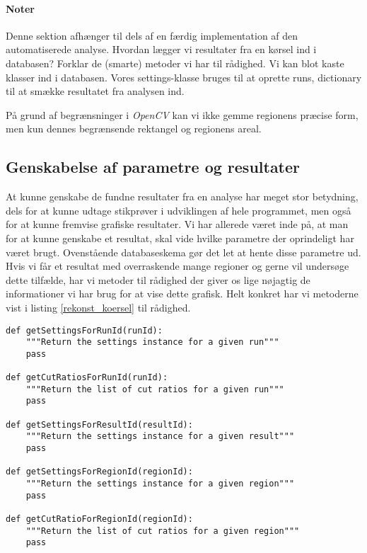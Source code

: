 {\paragraph{Noter}
Denne sektion afhænger til dels af en færdig implementation af den
automatiserede analyse. Hvordan lægger vi resultater fra en kørsel ind i
databasen? Forklar de (smarte) metoder vi har til rådighed. Vi kan blot
kaste klasser ind i databasen. Vores settings-klasse bruges til at
oprette runs, dictionary til at smække resultatet fra analysen ind.

På grund af begrænsninger i \emph{OpenCV} kan vi ikke gemme regionens
præcise form, men kun dennes begrænsende rektangel og regionens areal.

\subsection{Genskabelse af parametre og resultater}
At kunne genskabe de fundne resultater fra en analyse har meget stor
betydning, dels for at kunne udtage stikprøver i udviklingen af hele
programmet, men også for at kunne fremvise grafiske resultater. Vi har
allerede været inde på, at man for at kunne genskabe et resultat, skal
vide hvilke parametre der oprindeligt har været brugt. Ovenstående
databaseskema gør det let at hente disse parametre ud. Hvis vi får et
resultat med overraskende mange regioner og gerne vil undersøge dette
tilfælde, har vi metoder til rådighed der giver os lige nøjagtig de
informationer vi har brug for at vise dette grafisk. Helt konkret har vi
metoderne vist i listing \ref{rekonst_koersel} til rådighed.

\vspace{0.5cm}
\begin{lstlisting}[caption={Metoder til rekonstruktion af kørsler},captionpos=b,label={rekonst_koersel},numbers=none]
def getSettingsForRunId(runId):
    """Return the settings instance for a given run"""
    pass

def getCutRatiosForRunId(runId):
    """Return the list of cut ratios for a given run"""
    pass

def getSettingsForResultId(resultId):
    """Return the settings instance for a given result"""
    pass

def getSettingsForRegionId(regionId):
    """Return the settings instance for a given region"""
    pass

def getCutRatioForRegionId(regionId):
    """Return the list of cut ratios for a given region"""
    pass


\end{lstlisting}}
